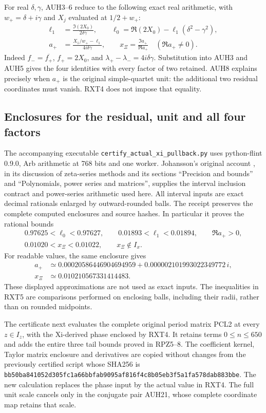 For real $\delta,\gamma$, AUH3--6 reduce to the following exact
real arithmetic, with $w_+=\delta+i\gamma$ and $X_j$ evaluated
at $1/2+w_+$:
\[
\begin{aligned}
 \ell_1&=\frac{\Im(2X_0)}{2\delta\gamma},\qquad
 \ell_0=\Re(2X_0)-\ell_1(\delta^2-\gamma^2),\\
 a_+&=\frac{X_1/w_+-\ell_1}{4i\delta\gamma},\qquad
 x_\Xi=\frac{\Im a_+}{\Re a_+}\quad(\Re a_+\ne0).
\end{aligned}\tag{RXT4}
\]
Indeed $f_-=\overline{f_+}$, $f_+=2X_0$, and
$\lambda_+-\lambda_-=4i\delta\gamma$. Substitution into
AUH3 and AUH5 gives the four identities with every factor of two
retained. AUH8 explains precisely when $a_+$ is the original
simple-quartet unit: the additional two residual coordinates must
vanish. RXT4 does not impose that equality.

\subsection{Enclosures for the residual, unit and all four factors}

The accompanying executable \texttt{certify\_actual\_xi\_pullback.py}
uses python-flint 0.9.0, Arb arithmetic at 768 bits and one worker.
Johansson's original account \cite{human:arb2016}, in its discussion
of zeta-series methods and its sections ``Precision and bounds''
and ``Polynomials, power series and matrices'', supplies the
interval inclusion contract and power-series arithmetic used here.
All interval inputs are exact decimal rationals enlarged by
outward-rounded balls. The receipt preserves the complete computed
enclosures and source hashes. In particular it proves the rational
bounds
\[
\begin{gathered}
 0.97625<\ell_0<0.97627,\qquad
 0.01893<\ell_1<0.01894,\qquad \Re a_+>0,\\
 0.01020<x_\Xi<0.01022,\qquad x_\Xi\notin I_x.
\end{gathered}\tag{RXT5}
\]
For readable values, the same enclosure gives
\[
 \begin{aligned}
 a_+&\simeq0.00020586446904694959+
 0.000002101993022349772\,i,\\
 x_\Xi&\simeq0.010210567331414483.
 \end{aligned}
\]
These displayed approximations are not used as exact inputs.
The inequalities in RXT5 are comparisons performed on enclosing
balls, including their radii, rather than on rounded midpoints.

The certificate next evaluates the complete original period matrix
PCL2 at every $z\in I_z$, with the Xi-derived phase enclosed by
RXT4. It retains terms $0\le n\le650$ and adds the entire
three tail bounds proved in RPZ5--8. The coefficient kernel,
Taylor matrix enclosure and derivatives are copied without changes
from the previously certified script whose SHA256 is
\texttt{bb50ba841052d305fc1a66bbfab9095af816f4c8b05eb3f5a1fa578dab883bbe}.
The new calculation replaces the phase input by the actual value
in RXT4. The full unit scale cancels only in the conjugate pair
AUH21, whose complete coordinate map retains that scale.

